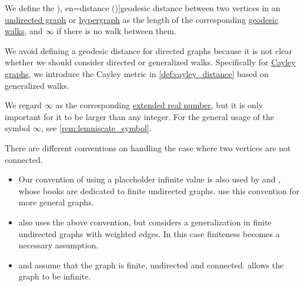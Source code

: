 \begin{definition}\label{def:graph_geodesic_distance}
  We define the \term[ru=расстояние (\cite[34]{ЕмеличевИПр1990ТеорияГрафов}), en=distance (\cite[def. 1.1.5]{Knauer2019AlgebraicGraphTheory})]{geodesic distance} between two vertices in an \hyperref[def:undirected_graph]{undirected graph} or \hyperref[def:hypergraph]{hypergraph} as the length of the corresponding \hyperref[def:graph_geodesic]{geodesic walks}, and \( \infty \) if there is no walk between them.
\end{definition}
\begin{comments}
  \item We avoid defining a geodesic distance for directed graphs because it is not clear whether we should consider directed or generalized walks. Specifically for \hyperref[def:cayley_graph]{Cayley graphs}, we introduce the Cayley metric in \cref{def:cayley_distance} based on generalized walks.

  \item We regard \( \infty \) as the corresponding \hyperref[def:extended_real_numbers]{extended real number}, but it is only important for it to be larger than any integer. For the general usage of the symbol \( \infty \), see \cref{rem:lemniscate_symbol}.

  \item There are different conventions on handling the case where two vertices are not connected.
  \begin{itemize}
    \item Our convention of using a placeholder infinite value is also used by \textcite[24]{Harary1969GraphTheory} and \textcite[6]{Bollobás1998ModernGraphTheory}, whose books are dedicated to finite undirected graphs. \Textcite[def. 1.1.5, rem. 1.1.6]{Knauer2019AlgebraicGraphTheory} use this convention for more general graphs.

    \item \Textcite[202]{Зыков2004ТеорияГрафов} also uses the above convention, but considers a generalization in finite undirected graphs with weighted edges. In this case finiteness becomes a necessary assumption.

    \item \Textcite[34]{ЕмеличевИПр1990ТеорияГрафов} and \textcite[\S 7.2.5]{Новиков2013ДискретнаяМатематика} assume that the graph is finite, undirected and connected. \Textcite[69]{König1990GraphTheory} allows the graph to be infinite.
  \end{itemize}
\end{comments}

